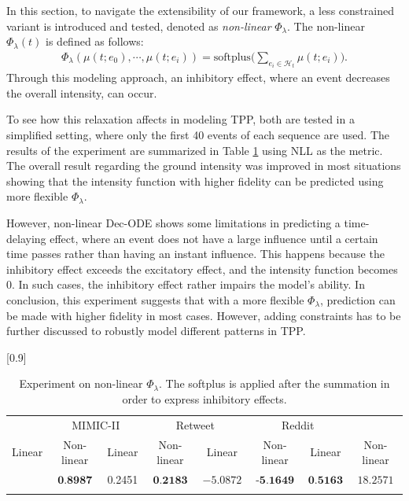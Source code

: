 In this section, to navigate the extensibility of our framework, a less constrained variant is introduced and tested, denoted as \textit{non-linear} $\Phi_\lambda$. 
The non-linear $\Phi_\lambda(t)$ is defined as follows:
\begin{align}
    \Phi_\lambda(\mu(t;e_0), \cdots, \mu(t;e_i)) = \text{softplus} \bigg( \sum _{e_i \in \mathcal{H}_{t}}  \mu  (t; e_i) \bigg).
\end{align}
Through this modeling approach, an inhibitory effect, where an event decreases the overall intensity, can occur. 

To see how this relaxation affects in modeling TPP, both are tested in a simplified setting, where only the first 40 events of each sequence are used. The results of the experiment are summarized in Table \ref{tab:nonlin} using NLL as the metric. 
The overall result regarding the ground intensity was improved in most situations showing that the intensity function with higher fidelity can be predicted using more flexible $\Phi_\lambda$.

However, non-linear Dec-ODE shows some limitations in predicting a time-delaying effect, where an event does not have a large influence until a certain time passes rather than having an instant influence.
This happens because the inhibitory effect exceeds the excitatory effect, and the intensity function becomes $0$.
In such cases, the inhibitory effect rather impairs the model's ability.
In conclusion, this experiment suggests that with a more flexible $\Phi_\lambda$, prediction can be made with higher fidelity in most cases.
However, adding constraints has to be further discussed to robustly model different patterns in TPP.

\begin{table}[h]
\centering
\caption{Experiment on non-linear $\Phi_\lambda$. The softplus is applied after the summation in order to express inhibitory effects.}
\scalebox{0.9}[0.9]{
\begin{tabular}{cc | cc| c c | cc } \Xhline{0.3ex}
\multicolumn{2}{c|}{StackOverflow} & \multicolumn{2}{c|}{MIMIC-II} & \multicolumn{2}{c|}{Retweet} & \multicolumn{2}{c}{Reddit}\\[-2pt]
Linear & Non-linear &  Linear & Non-linear  &  Linear & Non-linear  & Linear & Non-linear\\
\hline
\multirow{1}{*}{} $0.9948$ & $\textbf{0.8987}$ &0.2451 & $\textbf{0.2183}$ & $-5.0872$ & $\textbf{-5.1649}$ & $\textbf{0.5163}$ & $18.2571$ \\
\Xhline{0.3ex}      
\end{tabular}}
    \label{tab:nonlin}
\end{table}

